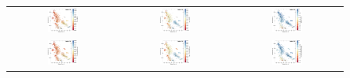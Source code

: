 \documentclass{aa}
\begin{document}
\begin{appendix}
\begin{figure}[htbp]
    \centering
    \begin{tabular}{ccc}
        \includegraphics[width=0.3\textwidth]{Plots/tsne_params/tsne_R6_Teff_GES.pdf} & \includegraphics[width=0.3\textwidth]{Plots/tsne_params/tsne_R6_logg_GES.pdf} & \includegraphics[width=0.3\textwidth]{Plots/tsne_params/tsne_R6_FeH_GES.pdf} \\
        \includegraphics[width=0.3\textwidth]{Plots/tsne_params/tsne_R6_Teff_GaiaXGBoost.pdf} & \includegraphics[width=0.3\textwidth]{Plots/tsne_params/tsne_R6_logg_GaiaXGBoost.pdf} & \includegraphics[width=0.3\textwidth]{Plots/tsne_params/tsne_R6_FeH_GaiaXGBoost.pdf} \\

\end{tabular}
\end{figure}
\end{appendix}
\end{document}
